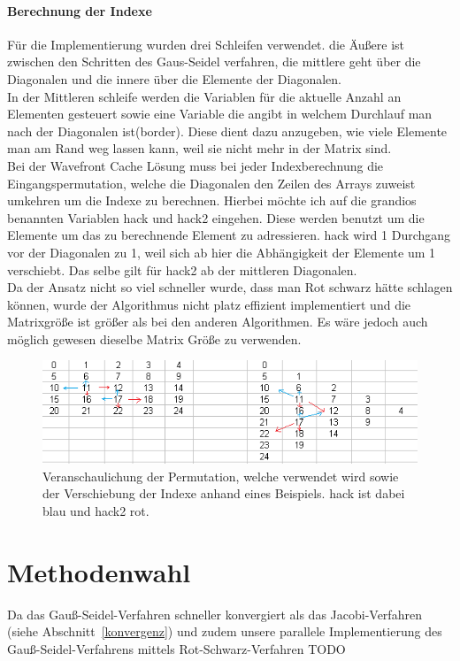 \documentclass{article}
\begin{document}
\paragraph{Berechnung der Indexe}
Für die Implementierung wurden drei Schleifen verwendet. die Äußere ist zwischen den Schritten des Gaus-Seidel verfahren, die mittlere geht über die Diagonalen und die innere über die Elemente der Diagonalen. \\
In der Mittleren schleife werden die Variablen für die aktuelle Anzahl an Elementen gesteuert sowie eine Variable die angibt in welchem Durchlauf man nach der Diagonalen ist(border). Diese dient dazu anzugeben, wie viele Elemente man am Rand weg lassen kann, weil sie nicht mehr in der Matrix sind.\\
Bei der Wavefront Cache Lösung muss bei jeder Indexberechnung die Eingangspermutation, welche die Diagonalen den Zeilen des Arrays zuweist umkehren um die Indexe zu berechnen. Hierbei möchte ich auf die grandios  benannten Variablen hack und hack2 eingehen. Diese werden benutzt um die Elemente um das zu berechnende Element zu adressieren. hack wird 1 Durchgang vor der Diagonalen zu 1, weil sich ab hier die Abhängigkeit der Elemente um 1 verschiebt. Das selbe gilt für hack2 ab der mittleren Diagonalen. \\
Da der Ansatz nicht so viel schneller wurde, dass man Rot schwarz hätte schlagen können, wurde der Algorithmus nicht platz effizient implementiert und die Matrixgröße ist größer als bei den anderen Algorithmen. Es wäre jedoch auch möglich gewesen dieselbe Matrix Größe zu verwenden.

\begin{figure}[htbp] 
  \centering
     \includegraphics[width=1\textwidth]{bilder/hack.png}
  \caption{Veranschaulichung der Permutation, welche verwendet wird sowie der Verschiebung der Indexe anhand eines Beispiels. hack ist dabei blau und hack2 rot.}
  \label{fig:Bild1}
\end{figure}

\section{Methodenwahl}
Da das Gauß-Seidel-Verfahren schneller konvergiert als das Jacobi-Verfahren (siehe Abschnitt~\ref{konvergenz}) und zudem unsere parallele Implementierung des Gauß-Seidel-Verfahrens mittels Rot-Schwarz-Verfahren TODO
\end{document}
